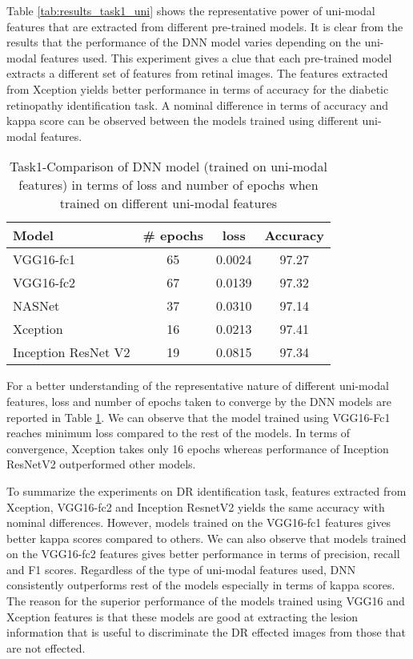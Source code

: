 \documentclass[electronics,article,accept ,moreauthors,pdftex]{mdpi}
\begin{document}
Table \ref{tab:results_task1_uni} shows the representative power of uni-modal features that are extracted from different pre-trained models.
It is clear from the results that the performance of the DNN model varies depending on the uni-modal features used. This experiment gives a clue that each pre-trained model extracts a different set of features from retinal images. 
The features extracted from Xception yields better performance in terms of accuracy for the diabetic retinopathy identification task. A nominal difference in terms of accuracy and kappa score can be observed between the models trained using different uni-modal features.

\begin{table}[htbp]
    \begin{center}  \caption{Task1-Comparison of DNN model (trained on uni-modal features) in terms of loss and number of epochs when trained on different uni-modal features } \renewcommand{\arraystretch}{1.5}    \begin{tabular}{|l|c|c|c|} \hline    \textbf{Model} & \textbf{\# epochs} & \textbf{loss} & \textbf{Accuracy}  \\ \hline
            VGG16-fc1 & 65 & 0.0024 & 97.27 \\ \hline
            VGG16-fc2 &    67 & 0.0139 & 97.32  \\ \hline
            NASNet    & 37 & 0.0310 & 97.14 \\ \hline
            Xception & 16 & 0.0213 & 97.41 \\ \hline
            Inception ResNet V2    & 19 & 0.0815 & 97.34 \\ \hline        \end{tabular}     \label{tab:result_binary_epochs}
    \end{center}
\end{table}

 

For a better understanding of the representative nature of different uni-modal features, loss and number of epochs taken to converge by the DNN models are reported in  Table \ref{tab:result_binary_epochs}.  We can observe that the model trained using VGG16-Fc1 reaches minimum loss compared to the rest of the models. In terms of convergence, Xception takes only 16 epochs whereas performance of Inception ResNetV2 outperformed other models.

To summarize the experiments on DR identification task, features extracted from Xception, VGG16-fc2 and Inception ResnetV2 yields  the same accuracy with nominal differences. However, models trained on the VGG16-fc1 features gives better kappa scores compared to others. We can also observe that models trained on the VGG16-fc2 features gives better performance in terms of  precision, recall and F1 scores. Regardless of the type of uni-modal features used, DNN consistently outperforms rest of the models especially in terms of kappa scores.
The reason for the superior performance of the models trained using VGG16 and Xception features is that these models are good at extracting the lesion information that is useful to discriminate the DR effected images  from those that are not effected.
\end{document}
